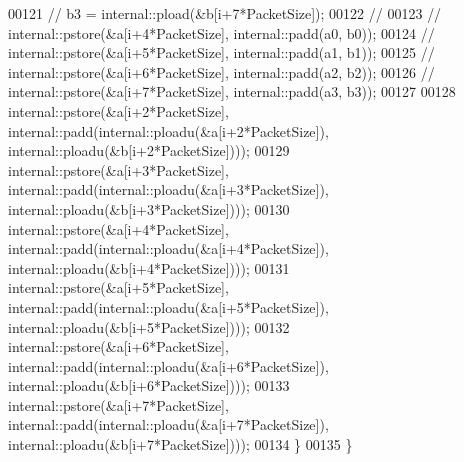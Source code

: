 \begin{DoxyCode}
00121 \textcolor{comment}{//             b3 = internal::pload(&b[i+7*PacketSize]);}
00122 \textcolor{comment}{//             }
00123 \textcolor{comment}{//             internal::pstore(&a[i+4*PacketSize], internal::padd(a0, b0));}
00124 \textcolor{comment}{//             internal::pstore(&a[i+5*PacketSize], internal::padd(a1, b1));}
00125 \textcolor{comment}{//             internal::pstore(&a[i+6*PacketSize], internal::padd(a2, b2));}
00126 \textcolor{comment}{//             internal::pstore(&a[i+7*PacketSize], internal::padd(a3, b3));}
00127             
00128             internal::pstore(&a[i+2*PacketSize], internal::padd(internal::ploadu(&a[i+2*PacketSize]), 
      internal::ploadu(&b[i+2*PacketSize])));
00129             internal::pstore(&a[i+3*PacketSize], internal::padd(internal::ploadu(&a[i+3*PacketSize]), 
      internal::ploadu(&b[i+3*PacketSize])));
00130             internal::pstore(&a[i+4*PacketSize], internal::padd(internal::ploadu(&a[i+4*PacketSize]), 
      internal::ploadu(&b[i+4*PacketSize])));
00131             internal::pstore(&a[i+5*PacketSize], internal::padd(internal::ploadu(&a[i+5*PacketSize]), 
      internal::ploadu(&b[i+5*PacketSize])));
00132             internal::pstore(&a[i+6*PacketSize], internal::padd(internal::ploadu(&a[i+6*PacketSize]), 
      internal::ploadu(&b[i+6*PacketSize])));
00133             internal::pstore(&a[i+7*PacketSize], internal::padd(internal::ploadu(&a[i+7*PacketSize]), 
      internal::ploadu(&b[i+7*PacketSize])));
00134         \}
00135 \}
\end{DoxyCode}

